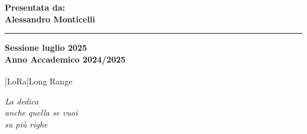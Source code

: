 \documentclass[12pt,a4paper,twoside]{book}
\begin{document}
\begin{titlepage}
\begin{minipage}[t]{0.40\textwidth}
        \vspace{3mm}

    \end{minipage}
    \hfill
    \begin{minipage}[t]{0.40\textwidth}\raggedleft
        {\Large{\bf Presentata da: \\ Alessandro Monticelli}}
    \end{minipage}

    \vspace{30mm}

    \rule[0.5cm]{\textwidth}{0.6mm}

    \begin{center}
        {\large{\bf Sessione luglio 2025 \\}}
        {\large{\bf Anno Accademico 2024/2025\\}}
    \end{center}

\end{titlepage}

[LoRa\textsuperscript{\textcopyright}]{Long Range}
\restoregeometry
\newpage




\topmargin=5.5cm
\begin{flushright}
    \emph{
        \LARGE{La dedica}\\\vspace{2mm}
        \LARGE{anche quella se vuoi}\\\vspace{3mm}
        \LARGE{su più righe}
    }
\end{flushright}
\newpage~\newpage
{}
\end{document}
